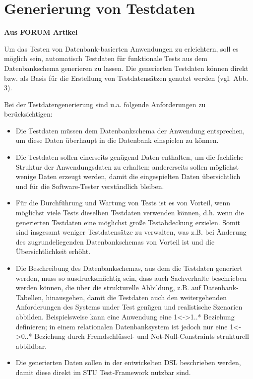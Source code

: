 \section{Generierung von Testdaten}

\textbf{Aus FORUM Artikel}

Um das Testen von Datenbank-basierten Anwendungen zu erleichtern, soll es möglich sein, automatisch Testdaten für funktionale Tests aus dem Datenbankschema generieren zu lassen. Die generierten Testdaten können direkt bzw. als Basis für die Erstellung von Testdatensätzen genutzt werden (vgl. Abb. 3). 

Bei der Testdatengenerierung sind u.a. folgende Anforderungen zu berücksichtigen:

\begin{itemize}

\item Die Testdaten müssen dem Datenbankschema der Anwendung entsprechen, um diese Daten überhaupt in die Datenbank einspielen zu können.
\item Die Testdaten sollen einerseits genügend Daten enthalten, um die fachliche Struktur der Anwendungsdaten zu erhalten; andererseits sollen möglichst wenige Daten erzeugt werden, damit die eingespielten Daten übersichtlich und für die Software-Tester verständlich bleiben.
\item Für die Durchführung und Wartung von Tests ist es von Vorteil, wenn möglichst viele Tests dieselben Testdaten verwenden können, d.h. wenn die generierten Testdaten eine möglichst große Testabdeckung erzielen. Somit sind insgesamt weniger Testdatensätze zu verwalten, was z.B. bei Änderung des zugrundeliegenden Datenbankschemas von Vorteil ist und die Übersichtlichkeit erhöht.
\item Die Beschreibung des Datenbankschemas, aus dem die Testdaten generiert werden, muss so ausdrucksmächtig sein, dass auch Sachverhalte beschrieben werden können, die über die strukturelle Abbildung, z.B. auf Datenbank-Tabellen, hinausgehen, damit die Testdaten auch den weitergehenden Anforderungen des Systems under Test genügen und realistische Szenarien abbilden. Beispielsweise kann eine Anwendung eine 1<->1..* Beziehung definieren; in einem relationalen Datenbanksystem ist jedoch nur eine 1<->0..* Beziehung durch Fremdschlüssel- und Not-Null-Constraints strukturell abbildbar.
\item Die generierten Daten sollen in der entwickelten DSL beschrieben werden, damit diese direkt im STU Test-Framework nutzbar sind.
\end{itemize}

